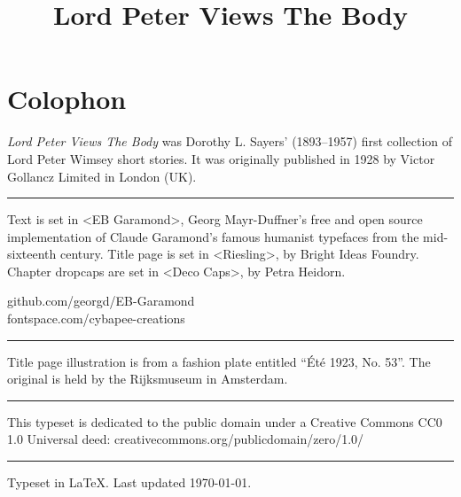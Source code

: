 \documentclass[
a5paper,
]{scrbook} %
\title{Lord Peter Views The Body}
\begin{document}
\frontmatter
\begin{titlepage}
 
\end{titlepage}




\tableofcontents





\mainmatter
\pagestyle{headings}
\renewcommand*{\chapterpagestyle}{plain}
















\clearpage
{}
\chapter*{Colophon}
\begin{center}
\begin{minipage}{\textwidth}
\textit{Lord Peter Views The Body} was Dorothy L. Sayers' (1893--1957) first collection of Lord Peter Wimsey short stories. It was originally published in 1928 by Victor Gollancz Limited in London (UK).
\end{minipage}
\vfill
\rule{0.5\textwidth}{.4pt}
\vfill

\begin{minipage}{\textwidth}
Text is set in <EB Garamond>, Georg Mayr-Duffner's free and open source implementation of Claude Garamond’s famous humanist typefaces from the mid-sixteenth century. Title page is set in <Riesling>, by Bright Ideas Foundry. Chapter dropcaps are set in <Deco Caps>, by Petra Heidorn.
\end{minipage}
\vfill
github.com/georgd/EB-Garamond\\fontspace.com/cybapee-creations
\vfill
\rule{0.5\textwidth}{.4pt}
\vfill
\begin{minipage}{\textwidth}
Title page illustration is from a fashion plate entitled \foreignquote{french}{Été 1923, No. 53}. The original is held by the Rijksmuseum in Amsterdam.
\end{minipage}
\vfill
\rule{0.5\textwidth}{.4pt}
\vfill

\begin{minipage}{\textwidth}
This typeset is dedicated to the public domain under a Creative Commons CC0 1.0 Universal deed: creativecommons.org/publicdomain/zero/1.0/
\end{minipage}
\vfill
\rule{0.5\textwidth}{.4pt}
\vfill
Typeset in \LaTeX{}. Last updated \today.
\end{center}
\thispagestyle{empty}
\end{document}
